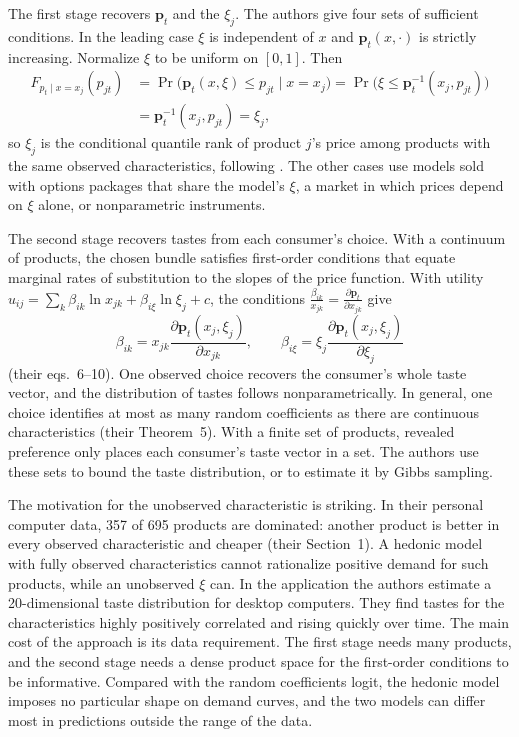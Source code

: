 The first stage recovers $\mathbf{p}_t$ and the $\xi_j$. The authors give four sets of sufficient conditions. In the
leading case $\xi$ is independent of $x$ and $\mathbf{p}_t(x, \cdot)$ is strictly increasing. Normalize $\xi$ to be
uniform on $[0, 1]$. Then
\begin{align*}
  F_{p_t \mid x = x_j}(p_{jt}) &= \Pr\big(\mathbf{p}_t(x, \xi) \leq p_{jt} \mid x = x_j\big)
  = \Pr\big(\xi \leq \mathbf{p}_t^{-1}(x_j, p_{jt})\big) \\
  &= \mathbf{p}_t^{-1}(x_j, p_{jt}) = \xi_j ,
\end{align*}
so $\xi_j$ is the conditional quantile rank of product $j$'s price among products with the same observed
characteristics, following \citet{Matzkin2003}. The other cases use models sold with options packages that share the
model's $\xi$, a market in which prices depend on $\xi$ alone, or nonparametric instruments.

The second stage recovers tastes from each consumer's choice. With a continuum of products, the chosen bundle
satisfies first-order conditions that equate marginal rates of substitution to the slopes of the price function. With
utility $u_{ij} = \sum_k \beta_{ik}\ln x_{jk} + \beta_{i\xi}\ln\xi_j + c$, the conditions
$\frac{\beta_{ik}}{x_{jk}} = \frac{\partial\mathbf{p}_t}{\partial x_{jk}}$ give
\begin{equation}\label{eq:08-hedonic-foc}
  \beta_{ik} = x_{jk}\frac{\partial\mathbf{p}_t(x_j, \xi_j)}{\partial x_{jk}}, \qquad
  \beta_{i\xi} = \xi_j\frac{\partial\mathbf{p}_t(x_j, \xi_j)}{\partial\xi_j}
\end{equation}
(their eqs.~6--10). One observed choice recovers the consumer's whole taste vector, and the distribution of tastes
follows nonparametrically. In general, one choice identifies at most as many random coefficients as there are
continuous characteristics (their Theorem~5). With a finite set of products, revealed preference only places each
consumer's taste vector in a set. The authors use these sets to bound the taste distribution, or to estimate it by
Gibbs sampling.

The motivation for the unobserved characteristic is striking. In their personal computer data, 357 of 695 products are
dominated: another product is better in every observed characteristic and cheaper (their Section~1). A hedonic model with
fully observed characteristics cannot rationalize positive demand for such products, while an unobserved $\xi$ can. In
the application the authors estimate a 20-dimensional taste distribution for desktop computers. They find tastes for
the characteristics highly positively correlated and rising quickly over time. The main cost of the approach is its
data requirement. The first stage needs many products, and the second stage needs a dense product space for the
first-order conditions to be informative. Compared with the random coefficients logit, the hedonic model imposes no
particular shape on demand curves, and the two models can differ most in predictions outside the range of the data.

